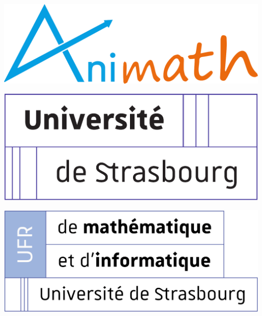 {\singlespacing
\vfill
\hfill
\begin{minipage}[c]{6in}
    \hfill
    \begin{minipage}[c]{1.5in}
        \includegraphics[width=.92\linewidth]{logos/logo-animath-large.png}
    \end{minipage}
    \hfill
    \begin{minipage}[c]{1.5in}
        \includegraphics[width=.92\linewidth]{logos/logo-unistra.pdf}
    \end{minipage}
    \hfill
    \vspace{1em}
    \vfill
    \hfill
    \begin{minipage}[c]{1.5in}
        \includegraphics[width=.92\linewidth]{logos/logo-ufr.png}

\end{minipage}
\end{minipage}}

